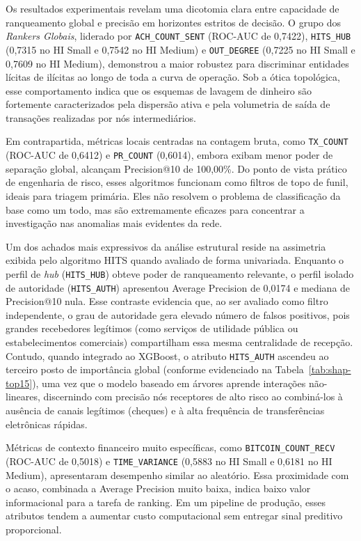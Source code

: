 \documentclass[a4paper,12pt,oneside,onecolumn,final,fleqn]{repUERJ}
\begin{document}
Os resultados experimentais revelam uma dicotomia clara entre capacidade de ranqueamento global e precisão em horizontes estritos de decisão. O grupo dos \textit{Rankers Globais}, liderado por \texttt{ACH\_COUNT\_SENT} (ROC-AUC de 0,7422), \texttt{HITS\_HUB} (0,7315 no HI Small e 0,7542 no HI Medium) e \texttt{OUT\_DEGREE} (0,7225 no HI Small e 0,7609 no HI Medium), demonstrou a maior robustez para discriminar entidades lícitas de ilícitas ao longo de toda a curva de operação. Sob a ótica topológica, esse comportamento indica que os esquemas de lavagem de dinheiro são fortemente caracterizados pela dispersão ativa e pela volumetria de saída de transações realizadas por nós intermediários.

Em contrapartida, métricas locais centradas na contagem bruta, como \texttt{TX\_COUNT} (ROC-AUC de 0,6412) e \texttt{PR\_COUNT} (0,6014), embora exibam menor poder de separação global, alcançam Precision@10 de 100,00\%. Do ponto de vista prático de engenharia de risco, esses algoritmos funcionam como filtros de topo de funil, ideais para triagem primária. Eles não resolvem o problema de classificação da base como um todo, mas são extremamente eficazes para concentrar a investigação nas anomalias mais evidentes da rede.

Um dos achados mais expressivos da análise estrutural reside na assimetria exibida pelo algoritmo HITS quando avaliado de forma univariada. Enquanto o perfil de \textit{hub} (\texttt{HITS\_HUB}) obteve poder de ranqueamento relevante, o perfil isolado de autoridade (\texttt{HITS\_AUTH}) apresentou Average Precision de 0,0174 e mediana de Precision@10 nula. Esse contraste evidencia que, ao ser avaliado como filtro independente, o grau de autoridade gera elevado número de falsos positivos, pois grandes recebedores legítimos (como serviços de utilidade pública ou estabelecimentos comerciais) compartilham essa mesma centralidade de recepção. Contudo, quando integrado ao XGBoost, o atributo \texttt{HITS\_AUTH} ascendeu ao terceiro posto de importância global (conforme evidenciado na Tabela~\ref{tab:shap-top15}), uma vez que o modelo baseado em árvores aprende interações não-lineares, discernindo com precisão nós receptores de alto risco ao combiná-los à ausência de canais legítimos (cheques) e à alta frequência de transferências eletrônicas rápidas.

Métricas de contexto financeiro muito específicas, como \texttt{BITCOIN\_COUNT\_RECV} (ROC-AUC de 0,5018) e \texttt{TIME\_VARIANCE} (0,5883 no HI Small e 0,6181 no HI Medium), apresentaram desempenho similar ao aleatório. Essa proximidade com o acaso, combinada a Average Precision muito baixa, indica baixo valor informacional para a tarefa de ranking. Em um pipeline de produção, esses atributos tendem a aumentar custo computacional sem entregar sinal preditivo proporcional.
\end{document}
